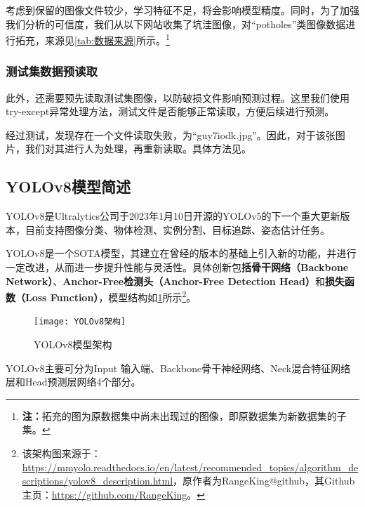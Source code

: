 \documentclass{MathorCupmodeling}
\begin{document}
	考虑到保留的图像文件较少，学习特征不足，将会影响模型精度。同时，为了加强我们分析的可信度，我们从以下网站收集了坑洼图像，对“potholes”类图像数据进行拓充，来源见\textcolor{blue}{\cref{tab:数据来源}}所示。\textcolor{blue}{\footnote{\textbf{注：}拓充的图为原数据集中尚未出现过的图像，即原数据集为新数据集的子集。}}
	\begin{table}[htbp]
		\centering
		\caption{拓充数据来源}
		\label{tab:数据来源}
	  \end{table}
	\subsubsection{测试集数据预读取}\label{预读取}
	此外，还需要预先读取测试集图像，以防破损文件影响预测过程。这里我们使用try-except异常处理方法，测试文件是否能够正常读取，方便后续进行预测。
	
	经过测试，发现存在一个文件读取失败，为“guy7iodk.jpg”。因此，对于该张图片，我们对其进行人为处理，再重新读取。具体方法见\textcolor{blue}{}。
	
	\subsection{YOLOv8模型简述}

	YOLOv8是Ultralytics公司于2023年1月10日开源的YOLOv5的下一个重大更新版本，目前支持图像分类、物体检测、实例分割、目标追踪、姿态估计任务\textcolor{blue}{\cite{YOLO任务}}。

	YOLOv8是一个SOTA模型，其建立在曾经的版本的基础上引入新的功能，并进行一定改进，从而进一步提升性能与灵活性。具体创新包\textbf{括骨干网络（Backbone Network）}、\textbf{Anchor-Free检测头（Anchor-Free Detection Head）}和\textbf{损失函数（Loss Function）}\textcolor{blue}{\cite{YOLO架构}}，模型结构如\textcolor{blue}{\cref{fig:YOLO架构}}所示\textcolor{blue}{\footnote{该架构图来源于：\url{https://mmyolo.readthedocs.io/en/latest/recommended_topics/algorithm_descriptions/yolov8_description.html}，原作者为RangeKing@github，其Github主页：\url{https://github.com/RangeKing}。}}。
	\begin{figure}[H]
		\centering
		\texttt{[image: YOLOv8架构]}
		\caption{YOLOv8模型架构}
		\label{fig:YOLO架构}
	\end{figure}
	YOLOv8主要可分为Input 输入端、Backbone骨干神经网络、Neck混合特征网络层和Head预测层网络4个部分\textcolor{blue}{\cite{YOLOv8简述}}。
	
\end{document}

